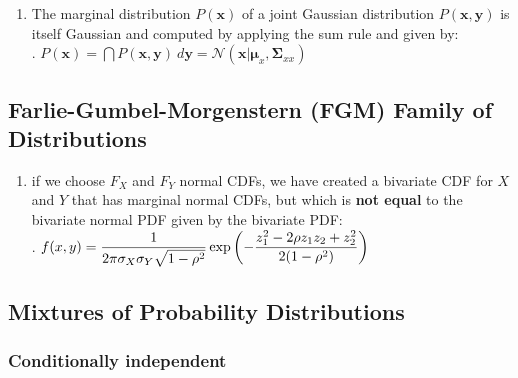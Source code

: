 \begin{enumerate}
    \item The marginal distribution $P(\bm{x})$ of a joint Gaussian distribution $P(\bm{x}, \bm{y})$ is itself Gaussian and computed by applying the sum rule and given by:
    \hfill \cite{mfml/book/mml/Deisenroth-Faisal-Ong}
    \\[0.2cm]
    .\hfill
    $
        P(\bm{x}) 
        = \dint P(\bm{x}, \bm{y})\ d\bm{y} 
        = \mathcal{N} (\bm{x} | \bm{\mu}_x, \bm{\Sigma}_{xx})
    $
    \hfill \cite{mfml/book/mml/Deisenroth-Faisal-Ong}
\end{enumerate}








\subsection{Farlie-Gumbel-Morgenstern (FGM) Family of Distributions}

\begin{enumerate}
    \item  if we choose $F_X$ and $F_Y$ normal CDFs, we have created a bivariate CDF for $X$ and $Y$ that has marginal normal CDFs, but which is \textbf{not equal} to the bivariate normal PDF given by the bivariate PDF:
    \hfill \cite{statistics/book/Statistics-for-Data-Scientists/Maurits-Kaptein}
    \\[0.3cm]
    .\hfill
    $
        f (x, y)
        = \dfrac{1}{ 2\pi\sigma_X \sigma_Y \sqrt{1 - \rho^2} }
        \exp \left(
            - \dfrac{z^2_1 - 2\rho z_1z_2 + z^2_2 }{2(1 - \rho^2)}
        \right)
    $
    \hfill \cite{statistics/book/Statistics-for-Data-Scientists/Maurits-Kaptein}
\end{enumerate}





\subsection{Mixtures of Probability Distributions}

\subsubsection{Conditionally independent}


